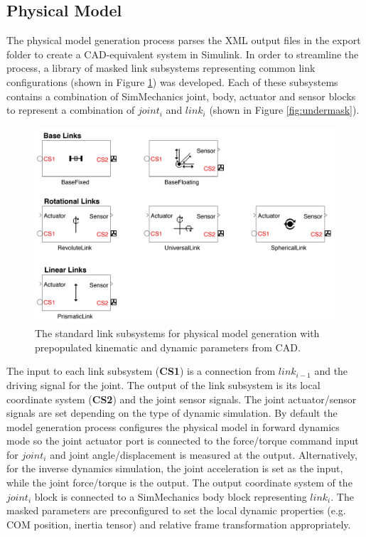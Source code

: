 \subsection{Physical Model} %
\label{sub:physical_model}

The physical model generation process parses the XML output files in the export folder to create a CAD-equivalent system in Simulink. In order to streamline the process, a library of masked link subsystems representing common link configurations (shown in Figure \ref{fig:quarcmech}) was developed. Each of these subsystems contains a combination of SimMechanics joint, body, actuator and sensor blocks to represent a combination of $joint_{i}$ and $link_{i}$ (shown in Figure \ref{fig:undermask}).

\begin{figure}[!h]
	\centering
    \includegraphics[scale=0.75]{fig/toolchain/simmech.pdf}
  	\caption{The standard link subsystems for physical model generation with prepopulated kinematic and dynamic parameters from CAD.}
	\label{fig:quarcmech}
\end{figure}

The input to each link subsystem (\textbf{CS1}) is a connection from $link_{i-1}$ and the driving signal for the joint. The output of the link subsystem is its local coordinate system (\textbf{CS2}) and the joint sensor signals. The joint actuator/sensor signals are set depending on the type of dynamic simulation. By default the model generation process configures the physical model in forward dynamics mode so the joint actuator port is connected to the force/torque command input for $joint_{i}$ and joint angle/displacement is measured at the output. Alternatively, for the inverse dynamics simulation, the joint acceleration is set as the input, while the joint force/torque is the output. The output coordinate system of the $joint_{i}$ block is connected to a SimMechanics body block representing $link_{i}$. The masked parameters are preconfigured to set the local dynamic properties (e.g. COM position, inertia tensor) and relative frame transformation appropriately.

